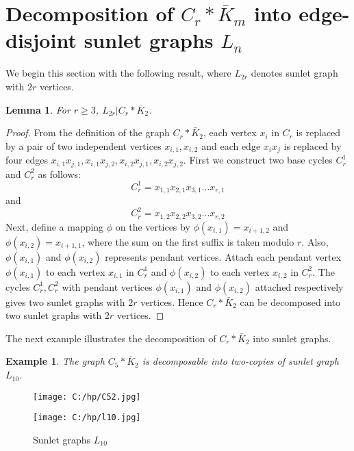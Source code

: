 \documentclass[12pt]{report}
\newtheorem{lem}[thm]{Lemma}
\newtheorem{exm}[thm]{Example}
\begin{document}
\section{Decomposition of  $C_{r}*\bar{K}_{m}$ into edge-disjoint sunlet graphs $L_n$}
We begin this section with the following result, where $L_{2r}$ denotes sunlet graph with $2r$ vertices.
\begin{lem}\label{L:N1}
For $r\geq 3$, $L_{2r}|C_{r}*\bar{K}_{2}$.
\end{lem}
\begin{proof}
From the definition of the graph $C_{r}*\bar{K}_{2}$,  each vertex
$x_i$ in $C_{r}$ is replaced by a pair of two independent vertices
$x_{i,1},x_{i,2}$ and each edge $x_ix_j$ is replaced by four edges
$x_{i,1}x_{j,1},x_{i,1}x_{j,2},x_{i,2}x_{j,1},x_{i,2}x_{j,2}$.  First we construct two base cycles $%
C_{r}^1$ and $C_{r}^2$ as follows:
 $$C_r^1=x_{1,1}x_{2,1}x_{3,1}...x_{r,1}$$and $$C_r^2=x_{1,2}x_{2,2}x_{3,2}...x_{r,2}$$
Next, define a mapping $\phi $ on the vertices by $\phi
(x_{i,1})=x_{i+1,2}$ and $\phi (x_{i,2})=x_{i+1,1}$, where
the sum on the first suffix is taken modulo $r$. Also, $\phi
(x_{i,1})$ and $\phi(x_{i,2})$ represents pendant vertices. Attach
each pendant vertex $\phi (x_{i,1})$ to each vertex $x_{i,1}$ in
$C_{r}^1$ and $\phi (x_{i,2})$ to each vertex $x_{i,2}$ in
$C_{r}^2$. The cycles $C_{r}^1,C_{r}^2$ with pendant vertices
$\phi(x_{i,1})$ and $\phi (x_{i,2})$ attached respectively gives two
sunlet graphs with $2r$ vertices. Hence $C_{r}*\bar{K}_{2}$ can be
decomposed into two sunlet graphs with $2r$ vertices.
\end{proof}
The next example illustrates the decomposition of  $C_r*\bar{K}_2$ into sunlet graphs.
\begin{exm}\label{E:L10}
The graph $C_{5}*\bar{K}_{2}$ is decomposable into two-copies of
sunlet graph $L_{10}$.
\end{exm}
\begin{figure}
\begin{center}
\texttt{[image: C:/hp/C52.jpg]}
\caption{ $C_5*\bar{K}_2$}
\end{center}
\begin{center}
\texttt{[image: C:/hp/l10.jpg]}
\caption{Sunlet graphs  $L_{10}$}
\end{center}
\end{figure}
\end{document}
